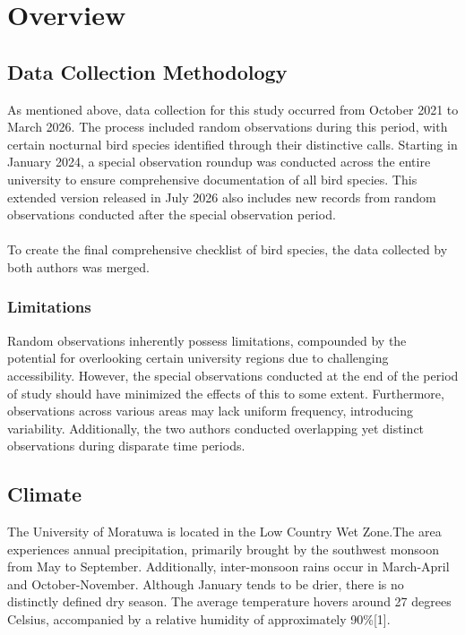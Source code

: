 \chapter{Overview}
\label{cp:overview}
\section{Data Collection Methodology}
As mentioned above, data collection for this study occurred from October 2021 to March 2026. The process included random observations during this period, with certain nocturnal bird species identified through their distinctive calls. Starting in January 2024, a special observation roundup was conducted across the entire university to ensure comprehensive documentation of all bird species. This extended version released in July 2026 also includes new records from random observations conducted after the special observation period.
\\\\
To create the final comprehensive checklist of bird species, the data collected by both authors was merged.

\begin{importantbox}
\subsection{Limitations}
 Random observations inherently possess limitations, compounded by the potential for overlooking certain university regions due to challenging accessibility. However, the special observations conducted at the end of the period of study should have minimized the effects of this to some extent. Furthermore, observations across various areas may lack uniform frequency, introducing variability. Additionally, the two authors conducted overlapping yet distinct observations during disparate time periods.
\end{importantbox}

\section{Climate}
The University of Moratuwa is located in the Low Country Wet Zone.The area experiences annual precipitation, primarily brought by the southwest monsoon from May to September. Additionally, inter-monsoon rains occur in March-April and October-November. Although January tends to be drier, there is no distinctly defined dry season. The average temperature hovers around 27 degrees Celsius, accompanied by a relative humidity of approximately 90\%[1].

